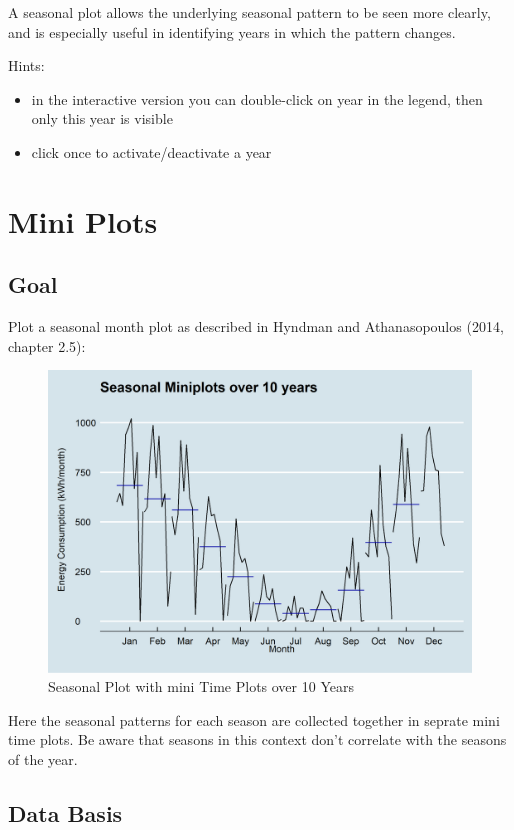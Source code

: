 \documentclass[
]{book}
\begin{document}
A seasonal plot allows the underlying seasonal pattern to be seen more clearly, and is especially useful in identifying years in which the pattern changes.

Hints:

\begin{itemize}
\item
  in the interactive version you can double-click on year in the legend, then only this year is visible
\item
  click once to activate/deactivate a year
\end{itemize}

\hypertarget{mini-plots}{%
\section{Mini Plots}\label{mini-plots}}

\hypertarget{goal-1}{%
\subsection{Goal}\label{goal-1}}

Plot a seasonal month plot as described in Hyndman and Athanasopoulos (2014, chapter 2.5):

\begin{figure}
\includegraphics[width=0.7\linewidth]{images/plotSeasonalMiniplots} \caption{Seasonal Plot with mini Time Plots over 10 Years}\label{fig:unnamed-chunk-5}
\end{figure}

Here the seasonal patterns for each season are collected together in seprate mini time plots. Be aware that seasons in this context don't correlate with the seasons of the year.

\hypertarget{data-basis-1}{%
\subsection{Data Basis}\label{data-basis-1}}
\end{document}
